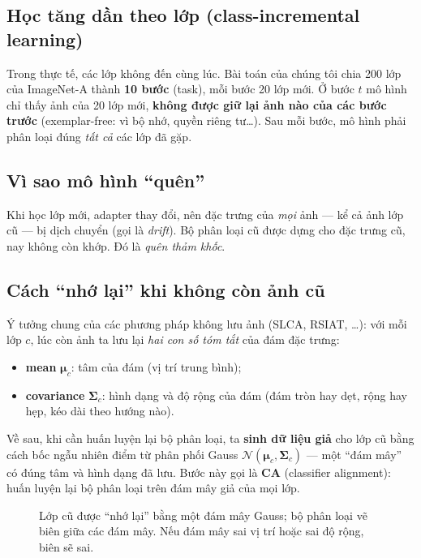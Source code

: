 \documentclass[11pt]{article}
\newcommand{\bmu}{\boldsymbol{\mu}}
\newcommand{\bSigma}{\boldsymbol{\Sigma}}
\begin{document}
\subsection{Học tăng dần theo lớp (class-incremental learning)}
Trong thực tế, các lớp không đến cùng lúc. Bài toán của chúng tôi chia 200 lớp của ImageNet-A thành \textbf{10 bước}
(task), mỗi bước 20 lớp mới. Ở bước $t$ mô hình chỉ thấy ảnh của 20 lớp mới, \textbf{không được giữ lại ảnh nào của
các bước trước} (exemplar-free: vì bộ nhớ, quyền riêng tư\dots). Sau mỗi bước, mô hình phải phân loại đúng \emph{tất
cả} các lớp đã gặp.

\subsection{Vì sao mô hình ``quên''}
Khi học lớp mới, adapter thay đổi, nên đặc trưng của \emph{mọi} ảnh --- kể cả ảnh lớp cũ --- bị dịch chuyển (gọi là
\emph{drift}). Bộ phân loại cũ được dựng cho đặc trưng cũ, nay không còn khớp. Đó là \emph{quên thảm khốc}.

\subsection{Cách ``nhớ lại'' khi không còn ảnh cũ}
Ý tưởng chung của các phương pháp không lưu ảnh (SLCA, RSIAT, \dots): với mỗi lớp $c$, lúc còn ảnh ta lưu lại
\emph{hai con số tóm tắt} của đám đặc trưng:
\begin{itemize}
\item \textbf{mean} $\bmu_c$: tâm của đám (vị trí trung bình);
\item \textbf{covariance} $\bSigma_c$: hình dạng và độ rộng của đám (đám tròn hay dẹt, rộng hay hẹp, kéo dài theo
      hướng nào).
\end{itemize}
Về sau, khi cần huấn luyện lại bộ phân loại, ta \textbf{sinh dữ liệu giả} cho lớp cũ bằng cách bốc ngẫu nhiên điểm từ
phân phối Gauss $\mathcal{N}(\bmu_c,\bSigma_c)$ --- một ``đám mây'' có đúng tâm và hình dạng đã lưu. Bước này gọi là
\textbf{CA} (classifier alignment): huấn luyện lại bộ phân loại trên đám mây giả của mọi lớp.

\begin{figure}[H]
\centering
{}
\caption{Lớp cũ được ``nhớ lại'' bằng một đám mây Gauss; bộ phân loại vẽ biên giữa các đám mây. Nếu đám mây sai vị trí
hoặc sai độ rộng, biên sẽ sai.}
\end{figure}
\end{document}
